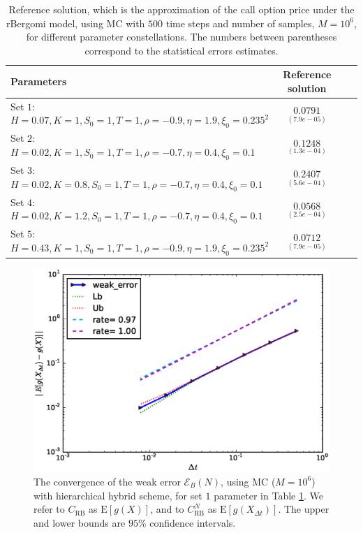 \documentclass[11pt]{article}
\newcommand{\expt}[1]{\mathrm{E}\left[#1\right]}
\begin{document}
\FloatBarrier
\begin{table}[!h]
	\centering
	\begin{small}
	\begin{tabular}{l*{2}{c}r}
	\toprule[1.5pt]
		Parameters            & Reference solution    \\
		\hline

			Set $1$:	$H=0.07, K=1,S_0=1, T=1, \rho=-0.9, \eta=1.9,\xi_0=0.235^2$   & $\underset{(7.9e-05)}{0.0791}$  \\	
			
				Set $2$:	$H=0.02, K=1, S_0=1, T=1,\rho=-0.7, \eta=0.4,\xi_0=0.1$   & $\underset{(1.3e-04)}{0.1248}$  \\
					Set $3$:	$H=0.02, K=0.8,S_0=1,T=1, \rho=-0.7, \eta=0.4,\xi_0=0.1$   & $\underset{(5.6e-04)}{0.2407}$  \\
						Set $4$:	$H=0.02, K=1.2,S_0=1,T=1, \rho=-0.7, \eta=0.4,\xi_0=0.1$   & $\underset{(2.5e-04)}{0.0568}$  \\
						Set $5$:	$H=0.43, K=1,S_0=1, T=1, \rho=-0.9, \eta=1.9,\xi_0=0.235^2$   & $\underset{(7.9e-05)}{ 0.0712}$  \\	
	\bottomrule[1.25pt]
	\end{tabular}
\end{small}
	\caption{Reference solution, which is the  approximation of the call option price under the rBergomi model,  using MC with $500$ time steps and number of samples, $M=10^6$, for different parameter constellations.  The numbers between parentheses correspond to the statistical errors estimates.}
	\label{table:Reference solution, using MC with $500$ time steps, of Call option price under rBergomi model, for different parameter constellation.}
\end{table}
\FloatBarrier



\FloatBarrier
\begin{figure}[h!]
	\centering
		\includegraphics[width=0.6\linewidth]{./figures/rBergomi_weak_error_rates/without_richardson/H_007/weak_convergence_order_Bergomi_H_007_K_1_M_4_10_6_CI_relative_hybrid_non_hierarchical_non_parallel}
		
	\caption{The  convergence of the weak error $\mathcal{E}_B(N)$, using MC ($M=10^6$) with hierarchical hybrid scheme, for set $1$ parameter in Table \ref{table:Reference solution, using MC with $500$ time steps, of Call option price under rBergomi model, for different parameter constellation.}. We refer to $C_{\text{RB}}$ as $\expt{g(X)}$, and to $C_{\text{RB}}^{N}$ as  $\expt{g(X_{\Delta t})}$. The upper and lower bounds are $95\%$ confidence intervals.}
	\label{fig:Weak_rate_set1_without_rich_hybrid}
\end{figure}
\FloatBarrier
\end{document}

